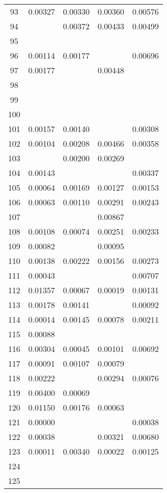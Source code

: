 \documentclass{elsarticle}
\begin{document}
\begin{center}
\begin{longtable}{|c|cccc|}
  93 & 0.00327 & 0.00330 & 0.00360 & 0.00576 \\
  94 &  & 0.00372 & 0.00433 & 0.00499 \\
  95 &  &  &  &  \\
  96 & 0.00114 & 0.00177 &  & 0.00696 \\
  97 & 0.00177 &  & 0.00448 &  \\
  98 &  &  &  &  \\
  99 &  &  &  &  \\
  100 &  &  &  &  \\
  101 & 0.00157 & 0.00140 &  & 0.00308 \\
  102 & 0.00104 & 0.00208 & 0.00466 & 0.00358 \\
  103 &  & 0.00200 & 0.00269 &  \\
  104 & 0.00143 &  &  & 0.00337 \\
  105 & 0.00064 & 0.00169 & 0.00127 & 0.00153 \\
  106 & 0.00063 & 0.00110 & 0.00291 & 0.00243 \\
  107 &  &  & 0.00867 &  \\
  108 & 0.00108 & 0.00074 & 0.00251 & 0.00233 \\
  109 & 0.00082 &  & 0.00095 &  \\
  110 & 0.00138 & 0.00222 & 0.00156 & 0.00273 \\
  111 & 0.00043 &  &  & 0.00707 \\
  112 & 0.01357 & 0.00067 & 0.00019 & 0.00131 \\
  113 & 0.00178 & 0.00141 &  & 0.00092 \\
  114 & 0.00014 & 0.00145 & 0.00078 & 0.00211 \\
  115 & 0.00088 &  &  &  \\
  116 & 0.00304 & 0.00045 & 0.00101 & 0.00692 \\
  117 & 0.00091 & 0.00107 & 0.00079 &  \\
  118 & 0.00222 &  & 0.00294 & 0.00076 \\
  119 & 0.00400 & 0.00069 &  &  \\
  120 & 0.01150 & 0.00176 & 0.00063 &  \\
  121 & 0.00000 &  &  & 0.00038 \\
  122 & 0.00038 &  & 0.00321 & 0.00680 \\
  123 & 0.00011 & 0.00340 & 0.00022 & 0.00125 \\
  124 &  &  &  &  \\
  125 &  &  &  & 
\label{fig:z}
\end{longtable}
\end{center}
\end{document}
